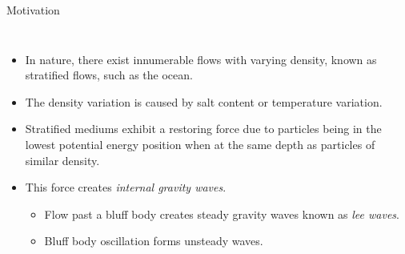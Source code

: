 \documentclass[aspectratio=169,xcolor=dvipsnames]{beamer}
\begin{document}
\begin{frame}{Motivation}
\begin{columns}[c]
        \begin{itemize}
            \item In nature, there exist innumerable flows with varying density, known as stratified flows, such as the ocean.
            \item The density variation is caused by salt content or temperature variation.
            \item Stratified mediums exhibit a restoring force due to particles being in the lowest potential energy position when at the same depth as particles of similar density. 
            \item This force creates \textit{internal gravity waves}.
            \begin{itemize}
                \item Flow past a bluff body creates steady gravity waves known as \textit{lee waves}.
                \item Bluff body oscillation forms unsteady waves. 
            \end{itemize} 
        \end{itemize}
    \end{columns}
\end{frame}

\end{document}
